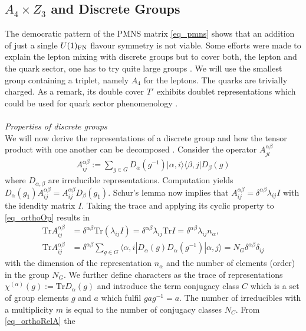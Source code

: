 
\subsection{$A_4\times Z_3$ and Discrete Groups}
\label{sec_A4GT}
The democratic pattern of the PMNS matrix \eqref{eq_pmns} shows that an addition of just a single $U(1)_\text{FN}$ flavour symmetry is not viable. Some efforts
were made to explain the lepton mixing with discrete groups but to cover both, the lepton and the quark sector, one has to try quite large groups
\cite{1605.03581}. We will use the smallest group containing a triplet, namely $A_4$ for the leptons. The quarks are trivially charged.
As a remark, its double cover $T'$ exhibits doublet representations which could be used for quark sector phenomenology \cite{Tprime}. 
\\ \\ \textit{Properties of discrete groups}\\
\noindent  We will now derive the representations of a discrete group and how the tensor product with one another can be decomposed \cite{1003.3552}. 
Consider the operator $A^{\alpha\beta}_{jl}$ \cite{georgi}
\begin{align}
 A^{\alpha\beta}_{ij} := \sum\limits_{g\in G} D_\alpha(g^{-1})|\alpha,i\rangle\langle \beta,j|D_\beta(g)
 \label{eq_orthoOp}
\end{align}
where $D_{\alpha,\beta}$ are irreducible representations. Computation yields $D_\alpha(g_1)A^{\alpha\beta}_{ij} = A^{\alpha\beta}_{ij}D_\beta(g_1)$. Schur's lemma now implies that
 $A^{\alpha\beta}_{ij}=\delta^{\alpha\beta} \lambda_{ij} I$ with the idendity matrix $I$. Taking the trace and applying its cyclic property to \eqref{eq_orthoOp}
results in
\begin{align}
 \text{Tr}A^{\alpha\beta}_{ij} &= \delta^{\alpha\beta}\text{Tr}\left(\lambda_{ij} I\right) = \delta^{\alpha\beta}\lambda_{ij} \text{Tr}I = \delta^{\alpha\beta}\lambda_{ij}n_\alpha,\\
 \text{Tr}A^{\alpha\beta}_{ij} &= \delta^{\alpha\beta}\sum\limits_{g\in G} \langle \alpha,i\left| D_\alpha(g)D_\alpha(g^{-1}) \right|\alpha,j\rangle = N_G \delta^{\alpha\beta}\delta_{ij}
 \label{eq_orthoRelA}
\end{align}
with the dimension of the representation $n_\alpha$ and the number of elements (order) in the group $N_G$. We further define characters as the trace of
representations $\chi^{(\alpha)}(g):= \text{Tr}D_\alpha(g)$ and introduce the term conjugacy class $C$ which is a set of group elements $g$ and $a$ which 
fulfil $gag^{-1}=a$.  The number of irreducibles with a multiplicity $m$ is equal to the number of conjugacy classes $N_C$. From \eqref{eq_orthoRelA} the 

